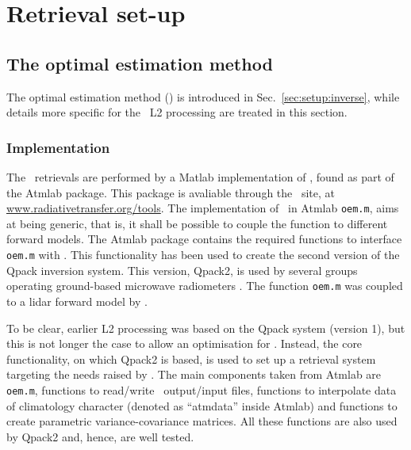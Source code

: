 \chapter{Retrieval set-up}
\label{chapter:retrieval}

\section{The optimal estimation method}
\label{sec:oem}
%
The optimal estimation method (\OEM) is introduced in
Sec.~\ref{sec:setup:inverse}, while details more specific for the \smr\ L2
processing are treated in this section.

\subsection{Implementation}
\label{sec:oem.m}
%
%
The \smr\ retrievals are performed by a Matlab implementation of \OEM, found as
part of the Atmlab package. This package is avaliable through the \ARTS\ site,
at \url{www.radiativetransfer.org/tools}. The implementation of \OEM\ in Atmlab
\texttt{oem.m}, aims at being generic, that is, it shall be possible to couple
the function to different forward models. The Atmlab package contains the
required functions to interface \texttt{oem.m} with \ARTS. This functionality
has been used to create the second version of the Qpack
\citep{eriksson:qpack:05} inversion system. This version, Qpack2, is used by
several groups operating ground-based microwave radiometers
\citep[e.g.][]{acp-15-5099-2015}. The function \texttt{oem.m} was coupled to a lidar
forward model by \citet{sica2015retrieval}.

To be clear, earlier L2 processing was based on the Qpack system (version
1), but this is not longer the case to allow an optimisation for \smr. Instead,
the core functionality, on which Qpack2 is based, is used to set up a retrieval
system targeting the needs raised by \smr. The main components taken from
Atmlab are \texttt{oem.m}, functions to read/write \ARTS\ output/input files,
functions to interpolate data of climatology character (denoted as ``atmdata''
inside Atmlab) and functions to create parametric variance-covariance matrices.
All these functions are also used by Qpack2 and, hence, are well tested.


